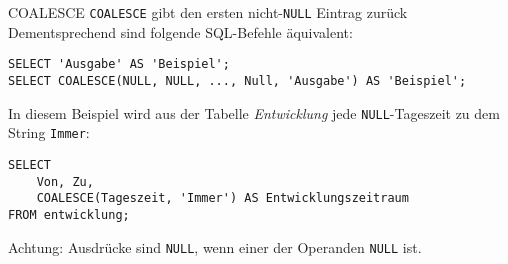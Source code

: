 \begin{bonus}{COALESCE}
    \texttt{COALESCE} gibt den ersten nicht-\texttt{NULL} Eintrag zurück
    Dementsprechend sind folgende SQL-Befehle äquivalent:

    \begin{verbatim}
SELECT 'Ausgabe' AS 'Beispiel';
SELECT COALESCE(NULL, NULL, ..., Null, 'Ausgabe') AS 'Beispiel';
    \end{verbatim}

    

    In diesem Beispiel wird aus der Tabelle \emph{Entwicklung} jede \texttt{NULL}-Tageszeit zu dem String \texttt{Immer}:

    \begin{verbatim}
SELECT
    Von, Zu,
    COALESCE(Tageszeit, 'Immer') AS Entwicklungszeitraum
FROM entwicklung;
    \end{verbatim}

    

    Achtung: Ausdrücke sind \texttt{NULL}, wenn einer der Operanden \texttt{NULL} ist.
\end{bonus}

